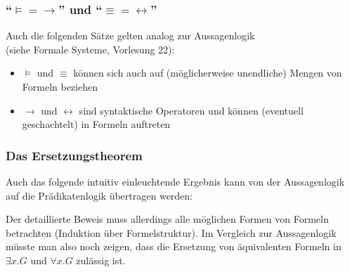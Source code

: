 \documentclass[aspectratio=1610,onlymath]{beamer}
\begin{document}
\begin{frame}\frametitle{"`${\models} = {\to}$"' und "`${\equiv}={\leftrightarrow}$"'}

Auch die folgenden Sätze gelten analog zur Aussagenlogik\\ (siehe Formale Systeme, Vorlesung 22):\bigskip

\bigskip

\bigskip

\bigskip

\begin{itemize}
\item $\models$ und $\equiv$ können sich auch auf (möglicherweise unendliche) Mengen von Formeln beziehen
\item $\to$ und $\leftrightarrow$ sind syntaktische Operatoren und können (eventuell geschachtelt) in Formeln auftreten
\end{itemize}

\end{frame}

\begin{frame}\frametitle{Das Ersetzungstheorem}

Auch das folgende intuitiv einleuchtende Ergebnis kann von der Aussagenlogik auf
die Prädikatenlogik übertragen werden:\bigskip

\bigskip

Der detaillierte Beweis muss allerdings alle möglichen Formen von
Formeln betrachten (Induktion über Formelstruktur). Im Vergleich zur
Aussagenlogik müsste man also noch zeigen, dass die Ersetzung von
äquivalenten Formeln in $\exists x.G$ und $\forall x.G$ zulässig ist.

\end{frame}
\end{document}
